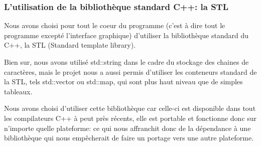 \subsubsection{L'utilisation de la bibliothèque standard C++: la STL}
Nous avons choisi pour tout le coeur du programme (c'est à dire tout le programme excepté l'interface graphique) d'utiliser la bibliothèque standard du C++, la STL (Standard template library).

Bien sur, nous avons utilisé std::string  dans le cadre du stockage des chaines de caractères, mais le projet nous a aussi permis d'utiliser les conteneurs standard de la STL, tels std::vector ou std::map, qui sont plus haut niveau que de simples tableaux.

Nous avons choisi d'utiliser cette bibliothèque car celle-ci est disponible dans tout les compilateurs C++ à peut près récents, elle est portable et fonctionne donc sur n'importe quelle plateforme: ce qui nous affranchit donc de la dépendance à une bibliothèque qui nous empêcherait de faire un portage vers une autre plateforme.
